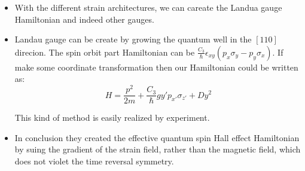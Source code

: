 \documentclass{beamer}
\begin{document}
\begin{frame}
  \begin{itemize}
    \item With the different strain architectures, we can careate the
      Landua gauge Hamiltonian and indeed other gauges. 
    \item Landau gauge can be create by growing the quantum well 
      in the $[110]$ direcion. The spin orbit part Hamiltonian can be 
      $\frac{C_3}{\hbar} \epsilon_{xy} (p_x \sigma_y - p_y \sigma_x)$. If
      make some coordinate transformation then our Hamiltonian could be
      written as:
\begin{equation*}
H = \frac{p^2}{2m} + \frac{C_3}{\hbar} g y' p_{x'} \sigma_{z'} + D
y^2
\end{equation*}

This kind of method is easily realized by experiment.

\item In conclusion they created the effective quantum spin Hall effect
Hamiltonian by suing the gradient of the strain field, rather than the 
magnetic field, which does not violet the time reversal symmetry.

\end{itemize} 
\end{frame}

\end{document}
